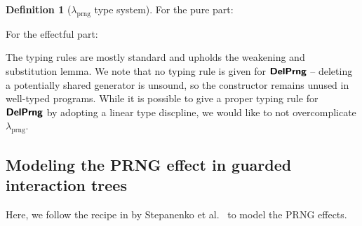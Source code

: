 \documentclass{article}
\theoremstyle{definition}
\newtheorem{definition}{Definition}[section]
\theoremstyle{plain}
\theoremstyle{remark}
\newcommand{\prng}{\mathrm{prng}}
\newcommand{\recval}[3]{\syn{rec}\;#1(#2)=#3}
\begin{document}
\begin{definition}[\(\lambda_{\prng}\) type system]
  For the pure part:
  For the effectful part:
\end{definition}
The typing rules are mostly standard and upholds the weakening and substitution lemma. We note that no typing rule is given for \(\bm{{ {\mathsf{DelPrng}}}}\) -- deleting a potentially shared generator is unsound, so the constructor remains unused in well-typed programs. While it is possible to give a proper typing rule for \(\bm{{ {\mathsf{DelPrng}}}}\) by adopting a linear type discpline, we would like to not overcomplicate \(\lambda_\prng\).

\subsection{Modeling the PRNG effect in guarded interaction trees}

Here, we follow the recipe in by Stepanenko et al.~\cite{esop25git-callcc} to model the PRNG effects.
\end{document}
